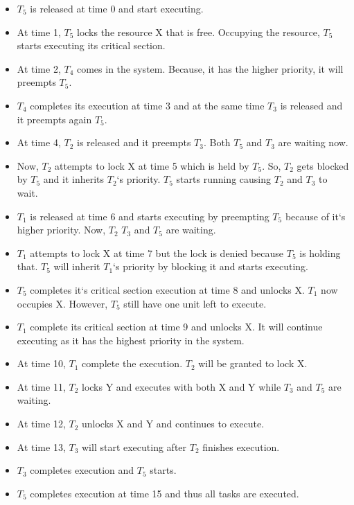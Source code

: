     \begin{itemize}
        \item $T_5$ is released at time 0 and start executing.
        \item At time 1, $T_5$ locks the resource X that is free. Occupying the resource, $T_5$ starts executing its critical section.
        \item At time 2, $T_4$ comes in the system. Because, it has the higher priority, it will preempts $T_5$.
        \item $T_4$ completes its execution at time 3 and at the same time $T_3$ is released and it preempts again $T_5$.
        \item At time 4, $T_2$ is released and it preempts $T_3$. Both $T_5$ and $T_3$ are waiting now.
        \item Now, $T_2$ attempts to lock X at time 5 which is held by  $T_5$. So,  $T_2$ gets blocked by  $T_5$ and it inherits  $T_2$`s priority.  $T_5$ starts running causing  $T_2$ and  $T_3$ to wait. 
        \item  $T_1$ is released at time 6 and starts executing by preempting  $T_5$ because of it`s higher priority. Now, $T_2$ $T_3$ and $T_5$ are waiting.
        \item  $T_1$ attempts to lock X at time 7 but the lock is denied because  $T_5$ is holding that.  $T_5$ will inherit $T_1$`s priority by blocking it and starts executing.
        \item $T_5$ completes it`s critical section execution at time 8 and unlocks X. $T_1$ now occupies X. However, $T_5$ still have one unit left to execute.
        \item $T_1$ complete its critical section at time 9 and unlocks X. It will continue executing as it has the highest priority in the system.
        \item At time 10, $T_1$ complete the execution. $T_2$ will be granted to lock X. 
        \item At time 11, $T_2$ locks Y and executes with both X and Y while $T_3$ and $T_5$ are waiting.
        \item At time 12, $T_2$ unlocks X and Y and continues to execute.
        \item At time 13, $T_3$ will start executing after $T_2$ finishes execution.
        \item $T_3$ completes execution and $T_5$ starts.
        \item $T_5$ completes execution at time 15 and thus all tasks are executed.
    \end{itemize}
